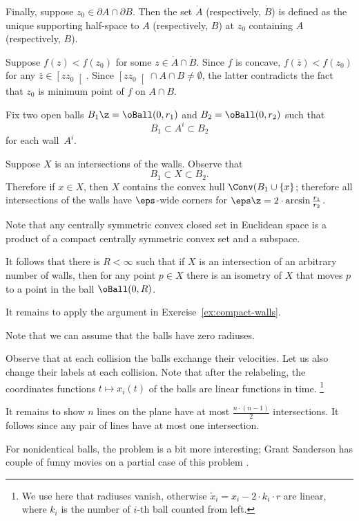 Finally, suppose $z_0\in\partial A\cap\partial B$. 
Then the set  $\dot A$ (respectively, $\dot B$) is defined as the unique supporting half-space to $A$ (respectively, $B$) at $z_0$ containing $A$ (respectively, $B$).

Suppose $f(z)<f(z_0)$ for some $z\in \dot A\cap\dot B$.
Since $f$ is concave,
$f(\bar z)<f(z_0)$ for any $\bar z \in \left[zz_0\right[$.
Since $\left[zz_0\right[\cap A\cap B\ne\emptyset$,
the latter contradicts the fact that $z_0$ is minimum point of $f$ on $A\cap B$.


Fix two open balls $B_1\z=\oBall(0,r_1)$ and $B_2=\oBall(0,r_2)$
such that 
\[B_1\subset A^i\subset B_2\]
for each wall~$A^i$.

Suppose $X$ is an intersections of  the walls.
Observe that 
\[B_1\subset X\subset B_2.\]
Therefore if $x\in X$, then $X$ contains the convex hull $\Conv(B_1\cup\{x\}$;
therefore all intersections of the walls have $\eps$-wide corners for $\eps\z=2\cdot \arcsin\tfrac{r_1}{r_2}$.

Note that any centrally symmetric convex closed set in Euclidean space is a product of a compact centrally symmetric convex set and a subspace.

It follows that there is $R<\infty$
such that if $X$ is an intersection of an arbitrary number of walls, then for any point $p\in X$ there is an isometry of $X$ 
that moves  $p$ to a point in the ball $\oBall(0,R)$.

It remains to apply the argument in Exercise~\ref{ex:compact-walls}.

Note that we can assume that the balls have zero radiuses.

Observe that at each collision the balls exchange their velocities.
Let us also change their labels at each collision.
Note that after the relabeling,  the coordinates functions $t\mapsto x_{i}(t)$ of the balls are linear functions in time.%
\footnote{We use here that radiuses vanish, otherwise $\tilde x_i=x_i-2\cdot k_i\cdot r$ are linear, where $k_i$ is the number of $i$-th ball counted from left.} 

It remains to show $n$ lines on the plane have at most $\tfrac{n\cdot(n-1)}2$ intersections.
It follows since any pair of lines have at most one intersection.

For nonidentical balls, the problem is a bit more interesting;
Grant Sanderson has couple of funny movies on a partial case of this problem \cite{sanderson}.

